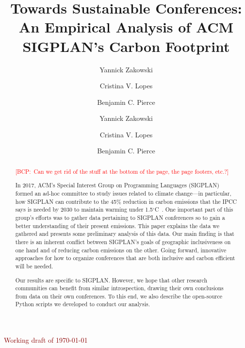 \documentclass[screen,acmlarge]{acmart}
\title{Towards Sustainable Conferences: \\
An Empirical Analysis of ACM SIGPLAN's Carbon Footprint}
\author{Yannick Zakowski}
\affiliation{%
  \institution{Inria}
  \city{Lyon}
  \country{France}}
\author{Cristina V. Lopes}
\affiliation{%
  \institution{University of California, Irvine}
  \city{Irvine}
  \state{CA}
  \postcode{92697}
  \country{USA}}
\author{Benjamin C. Pierce}
\affiliation{%
  \institution{University of Pennsylvania}
  \city{Philadelphia}
  \state{PA}
  \country{USA}}
\author{Yannick Zakowski \and Cristina V. Lopes \and Benjamin C. Pierce}
\newif\ifcomments\commentstrue   %
\newcommand{\bcp}[1]{\textcolor{red}{{[BCP:~#1]}}}
\newcommand{\bcp}[1]{}
\newif\ifopinions\opinionstrue   %
\begin{document}
\maketitle

\begin{abstract}
\ifacmstyle
\bcp{Can we get rid of the stuff at the bottom of the page, the page
  footers, etc.?}
\fi

\noindent In 2017, ACM's Special Interest Group on Programming Languages (SIGPLAN)
formed an ad-hoc committee to study issues related to climate change---in
particular, how SIGPLAN can contribute to the 45\% reduction in carbon
emissions that the IPCC says is needed by 2030 to maintain warming under
1.5$^{\circ}$C~\cite{IPCCReport}.
One important part of this group's efforts was
to gather data pertaining to SIGPLAN conferences so to gain a better
understanding of their present emissions. This paper explains the data we
gathered and presents some preliminary analysis of this data. Our main
finding is that there is an inherent conflict between SIGPLAN's goals of
geographic inclusiveness on one hand and of reducing carbon emissions on the
other. Going forward, innovative approaches for how to organize conferences
that are both inclusive and carbon efficient will be needed.

Our results are specific to SIGPLAN.  However, we hope that other research
communities can benefit from similar introspection, drawing their own
conclusions from data on their own conferences. To this end, we also
describe the open-source Python scripts we developed to conduct our
analysis.

\end{abstract}

\ifacmstyle
{}
\fi

\begin{center}
\bigskip
{\ifcomments\huge\textcolor{darkred}{Working draft of \today}\fi}
\end{center}









\end{document}
